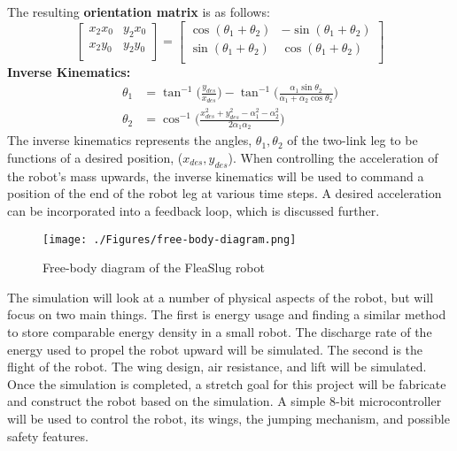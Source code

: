 \indent The resulting \textbf{orientation matrix} is as follows:
\begin{equation}
	\begin{bmatrix}
		x_2x_0 & y_2x_0\\
		x_2y_0 & y_2y_0\\
	\end{bmatrix}
	= 
	\begin{bmatrix}
		\cos(\theta_1 + \theta_2) & -\sin(\theta_1 + \theta_2)\\
		\sin(\theta_1 + \theta_2) & \cos(\theta_1 + \theta_2)\\
	\end{bmatrix}
\end{equation}
\textbf{Inverse Kinematics:}
\begin{align}
	\theta_1 & = \tan^{-1}\bigg(\frac{y_{des}}{x_{des}}\bigg)-\tan^{-1}\bigg(\frac{\alpha_1\sin\theta_2}{\alpha_1+\alpha_2\cos\theta_2}\bigg)\\
	\theta_2 &= \cos^{-1}\bigg(\frac{x_{des}^2 + y_{des}^2 - \alpha_1^2 - \alpha_2^2}{2\alpha_1\alpha_2}\bigg)
\end{align}
\indent The inverse kinematics represents the angles, $\theta_1, \theta_2$ of the two-link leg to be functions of a desired position, ($x_{des}, y_{des}$). When controlling the acceleration of the robot's mass upwards, the inverse kinematics will be used to command a position of the end of the robot leg at various time steps. A desired acceleration can be incorporated into a feedback loop, which is discussed further.\\
\begin{figure}[H]
\begin{center}
\texttt{[image: ./Figures/free-body-diagram.png]}
\caption{Free-body diagram of the FleaSlug robot}
\label{fig:free-body-diagram}
\end{center}
\end{figure}
\indent The simulation will look at a number of physical aspects of the robot, but will focus on two main things. The first is energy usage and finding a similar method to store comparable energy density in a small robot. The discharge rate of the energy used to propel the robot upward will be simulated. The second is the flight of the robot. The wing design, air resistance, and lift will be simulated.\\
\indent Once the simulation is completed, a stretch goal for this project will be fabricate and construct the robot based on the simulation. A simple 8-bit microcontroller will be used to control the robot, its wings, the jumping mechanism, and possible safety features.\\
